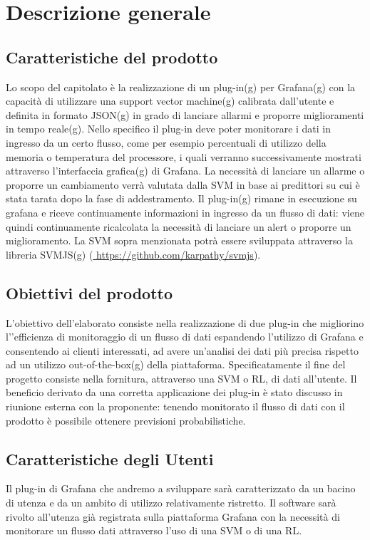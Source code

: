 \section{Descrizione generale}
   \subsection{Caratteristiche del prodotto}
   Lo scopo del capitolato è la realizzazione di un plug-in(g) per Grafana(g) con la capacità di utilizzare una support vector machine(g) calibrata dall’utente e definita in formato JSON(g) in grado di lanciare allarmi e proporre miglioramenti in tempo reale(g).
Nello specifico il plug-in deve poter monitorare i dati in ingresso da un certo flusso, come per esempio percentuali di utilizzo della memoria o temperatura del processore, i quali verranno successivamente mostrati attraverso l’interfaccia grafica(g) di Grafana.
La necessità di lanciare un allarme o proporre un cambiamento verrà valutata dalla SVM in base ai predittori su cui è stata tarata dopo la fase di addestramento.
Il plug-in(g) rimane in esecuzione su grafana e riceve continuamente informazioni in ingresso da un flusso di dati: viene quindi continuamente ricalcolata la necessità di lanciare un alert o proporre un miglioramento.
La SVM sopra menzionata potrà essere sviluppata attraverso la libreria SVMJS(g) (\url{ https://github.com/karpathy/svmjs}).

	\subsection{Obiettivi del prodotto}
	L’obiettivo dell’elaborato consiste nella realizzazione di due plug-in che migliorino l’’efficienza di monitoraggio di un flusso di dati espandendo l’utilizzo di Grafana e consentendo ai clienti  interessati, ad avere un’analisi dei dati più precisa rispetto ad un utilizzo out-of-the-box(g) della piattaforma. Specificatamente il  fine del progetto consiste nella fornitura, attraverso una SVM o RL, di dati all’utente. Il beneficio derivato da una corretta applicazione dei plug-in è stato discusso in riunione esterna con la proponente: tenendo monitorato il flusso di dati con il prodotto è possibile ottenere previsioni probabilistiche. 
	\subsection{Caratteristiche degli Utenti}
	Il plug-in di Grafana che andremo a sviluppare sarà caratterizzato da un bacino di utenza e da un ambito di utilizzo relativamente ristretto.
Il software sarà rivolto all’utenza già registrata sulla piattaforma Grafana con la necessità di monitorare un flusso dati attraverso l’uso di una SVM o di una RL.


